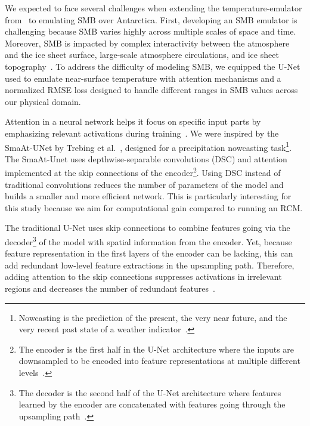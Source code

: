 \documentclass[a4paper,11pt,oneside]{report}
\begin{document}
    
We expected to face several challenges when extending the temperature-emulator from~\cite{Doury} to emulating SMB over Antarctica. First, developing an SMB emulator is challenging because SMB varies highly across multiple scales of space and time. Moreover, SMB is impacted by complex interactivity between the atmosphere and the ice sheet surface, large-scale atmosphere circulations, and ice sheet topography~\cite{Lenaerts2019}. To address the difficulty of modeling SMB, we equipped the U-Net used to emulate near-surface temperature with attention mechanisms and a normalized RMSE loss designed to handle different ranges in SMB values across our physical domain. 
    
Attention in a neural network helps it focus on specific input parts by emphasizing relevant activations during training~\cite{Sanghyun2018, AttentionUNet, Oktay2018}. We were inspired by the SmaAt-UNet by Trebing et al.~\cite{smatunet}, designed for a precipitation nowcasting task\footnote{Nowcasting is the prediction of the present, the very near future, and the very recent past state of a weather indicator~\cite{Nowcasting}.}. The SmaAt-Unet uses depthwise-separable convolutions (DSC) and attention implemented at the skip connections of the encoder\footnote{The encoder is the first half in the U-Net architecture where the inputs are downsampled to be encoded into feature representations at multiple different levels~\cite{Encoder}.}. Using DSC instead of traditional convolutions reduces the number of parameters of the model and builds a smaller and more efficient network. This is particularly interesting for this study because we aim for computational gain compared to running an RCM.     
    
The traditional U-Net uses skip connections to combine features going via the decoder\footnote{The decoder is the second half of the U-Net architecture where features learned by the encoder are concatenated with features going through the upsampling path~\cite{Encoder}.} of the model with spatial information from the encoder. Yet, because feature representation in the first layers of the encoder can be lacking, this can add redundant low-level feature extractions in the upsampling path. Therefore, adding attention to the skip connections suppresses activations in irrelevant regions and decreases the number of redundant features~\cite{AttentionUNet}.
    
\end{document}
